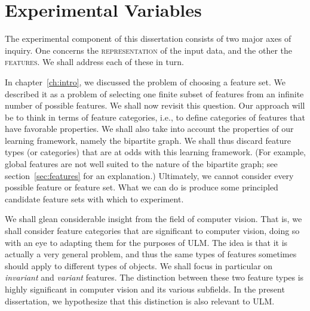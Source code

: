 \section{Experimental Variables}\label{sec:expvars}
The experimental component of this dissertation consists of two major axes of inquiry. 
One concerns the \textsc{representation} of the input data, and the other the \textsc{features}. 
We shall address each of these in turn. 

In chapter~\ref{ch:intro}, we discussed the problem of choosing a feature set. 
We described it as a problem of selecting one finite subset of 
features from an infinite number of possible features.
We shall now revisit this question. Our approach 
will be to think in terms of feature categories, i.e., to define categories of 
features that have favorable properties. We shall also take into account 
the properties of our learning framework, namely the bipartite graph. We shall thus discard feature types 
(or categories) that are at odds with this learning framework. (For example, global features are not well suited to
the nature of the bipartite graph; see section~\ref{sec:features} for an explanation.)
Ultimately, we cannot consider every 
possible feature or feature set. What we can do is produce some 
principled candidate feature sets with which to experiment. 

We shall glean considerable insight from the field of computer vision. 
That is, we shall consider feature 
categories that are significant to computer vision, doing so with an 
eye to adapting them for the purposes of ULM. The idea is that it
is actually a very general problem, and thus the same types of features 
sometimes should apply to different types of objects.
We shall focus in particular on \emph{invariant} and \emph{variant} 
features. The distinction between these two feature types is highly significant in
computer vision and its various subfields. In the present dissertation, 
we hypothesize that this distinction is also relevant to ULM. 

